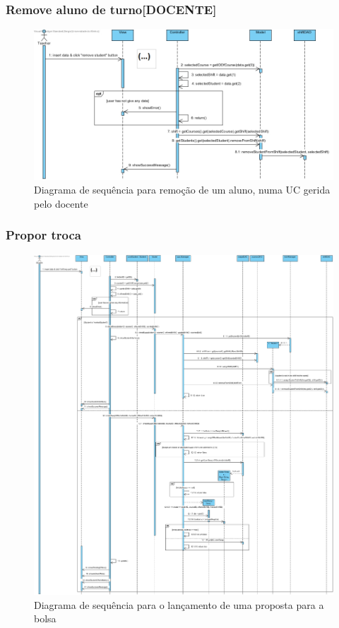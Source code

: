 \documentclass[a4paper]{article}
\begin{document}
\subsubsection{Remove aluno de turno[DOCENTE]}
\begin{figure}[H]
\centering
\includegraphics[width=14cm]{SEQRemoverAlunoTurno(peloDocente)}
\caption{Diagrama de sequência para remoção de um aluno, numa UC gerida pelo docente}
\label{}
\end{figure}

\subsubsection{Propor troca}

\begin{figure}[H]
\centering
\includegraphics[width=14cm]{SEQProporTroca}
\caption{Diagrama de sequência para o lançamento de uma proposta para a bolsa}
\label{}
\end{figure}
\end{document}
